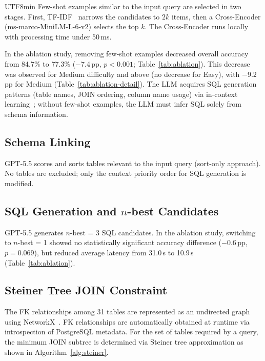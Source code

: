 \documentclass[sn-mathphys,Numbered]{sn-jnl}
\begin{document}
\begin{CJK}{UTF8}{min}
Few-shot examples similar to the input query are selected in two stages.
First, TF-IDF~\cite{salton1988tfidf} narrows the candidates to $2k$ items,
then a Cross-Encoder (ms-marco-MiniLM-L-6-v2) selects the top $k$.
The Cross-Encoder runs locally with processing time under 50\,ms.

In the ablation study, removing few-shot examples decreased
overall accuracy from 84.7\% to 77.3\% ($-$7.4\,pp,
$p<0.001$; Table~\ref{tab:ablation}).
This decrease was observed for Medium difficulty and above (no decrease for Easy),
with $-$9.2\,pp for Medium (Table~\ref{tab:ablation-detail}).
The LLM acquires SQL generation patterns
(table names, JOIN ordering, column name usage)
via in-context learning~\cite{brown2020fewshot};
without few-shot examples, the LLM must infer SQL solely from schema information.

\subsection{Schema Linking}

GPT-5.5 scores and sorts tables relevant to the input query
(sort-only approach).
No tables are excluded; only the context priority order
for SQL generation is modified.

\subsection{SQL Generation and $n$-best Candidates}

GPT-5.5 generates $n$-best = 3 SQL candidates.
In the ablation study, switching to $n$-best = 1 showed
no statistically significant accuracy difference ($-$0.6\,pp, $p=0.069$),
but reduced average latency from 31.0\,s to 10.9\,s
(Table~\ref{tab:ablation}).

\subsection{Steiner Tree JOIN Constraint}
\label{sec:schema_graph}

The FK relationships among 31 tables are represented as an undirected graph
using NetworkX~\cite{networkx2008}.
FK relationships are automatically obtained at runtime via introspection
of PostgreSQL metadata.
For the set of tables required by a query,
the minimum JOIN subtree is determined via Steiner tree approximation
as shown in Algorithm~\ref{alg:steiner}.


\end{CJK}
\end{document}
